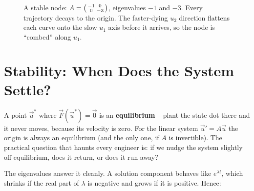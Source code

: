 \begin{figure}[H]
\centering
{}
\caption{A stable node: $A=\protect\begin{psmallmatrix} -1 & 0 \\ 0 &
-3\protect\end{psmallmatrix}$, eigenvalues $-1$ and $-3$. Every trajectory decays
to the origin. The faster-dying $u_2$ direction flattens each curve onto the slow
$u_1$ axis before it arrives, so the node is ``combed'' along $u_1$.}
\label{ch39:fig-node}
\end{figure}

\section{Stability: When Does the System Settle?}
\label{ch39:stability}

A point $\vec u^{*}$ where $\vec F(\vec u^{*}) = \vec 0$ is an
\textbf{equilibrium} -- plant the state dot there and it never moves, because its
velocity is zero. For the linear system $\vec u' = A\vec u$ the origin is always
an equilibrium (and the only one, if $A$ is invertible). The practical question
that haunts every engineer is: if we nudge the system slightly off equilibrium,
does it return, or does it run away?

The eigenvalues answer it cleanly. A solution component behaves like
$e^{\lambda t}$, which shrinks if the real part of $\lambda$ is negative and
grows if it is positive. Hence:

